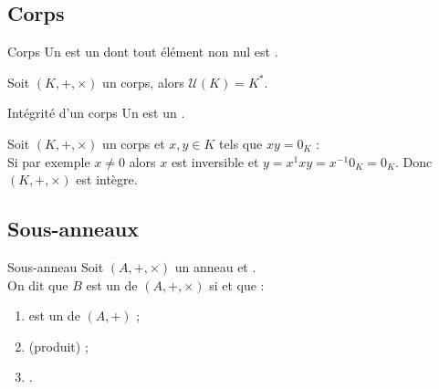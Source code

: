 \documentclass[12pt,a4paper]{report}
\begin{document}
    \pagebreak
    
    \subsection{Corps}

    \begin{definition}{Corps}{}
    Un  est un  dont tout élément non nul est .
    \end{definition}
    
    \begin{remarque}
    Soit $(K, +, \times)$ un corps, alors $\mathcal{U}(K) = K^*$.
    \end{remarque}
    
    \begin{proposition}{Intégrité d'un corps}{}
    Un  est un .
    \end{proposition}
    
    \begin{demo}
    Soit $(K, +, \times)$ un corps et $x, y \in K$ tels que $xy = 0_K$ :\\
    Si par exemple $x \neq 0$ alors $x$ est inversible et $y = x^{1}xy = x^{-1}0_K = 0_K$. Donc $(K, +, \times)$ est intègre.
    \end{demo}
    
    
    \subsection{Sous-anneaux}
    
    \begin{definition}{Sous-anneau}{}
    Soit $(A, +, \times)$ un anneau et .\\
    On dit que $B$ est un  de $(A, +, \times)$ si  et que :
    \begin{multicols}{2}
    \begin{enumerate}[label=\bfseries\arabic*)]
        \item {} est un  de $(A, +)$ ;
        \item {} (produit) ;
        \item {}.
    \end{enumerate}
    \end{multicols}
    \end{definition}
    
\end{document}
